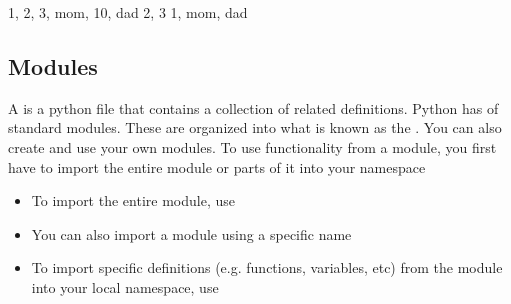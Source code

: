 \documentclass[letterpaper,10pt,english]{sphinxmanual}
\begin{document}
\begin{sphinxVerbatim}[commandchars=\\\{\}]
\PYGZob{}1, 2, 3, \PYGZsq{}mom\PYGZsq{}, 10, \PYGZsq{}dad\PYGZsq{}\PYGZcb{}
\PYGZob{}2, 3\PYGZcb{}
\PYGZob{}1, \PYGZsq{}mom\PYGZsq{}, \PYGZsq{}dad\PYGZsq{}\PYGZcb{}
\end{sphinxVerbatim}


\subsection{Modules}
\label{\detokenize{content/Introduction_to_Programming:modules}}
A  is a python file that contains a collection of related definitions. Python has  of standard modules.  These are organized into what is known as the .  You can also create and use your own modules.  To use functionality from a module, you first have to import the entire module or parts of it into your namespace
\begin{itemize}
\item {} 
To import the entire module, use

\end{itemize}

\begin{sphinxVerbatim}[commandchars=\\\{\}]
 
\end{sphinxVerbatim}
\begin{itemize}
\item {} 
You can also import a module using a specific name

\end{itemize}

\begin{sphinxVerbatim}[commandchars=\\\{\}]
   
\end{sphinxVerbatim}
\begin{itemize}
\item {} 
To import specific definitions (e.g. functions, variables, etc) from the module into your local namespace, use

\end{itemize}

\begin{sphinxVerbatim}[commandchars=\\\{\}]
    
\end{sphinxVerbatim}
\end{document}
